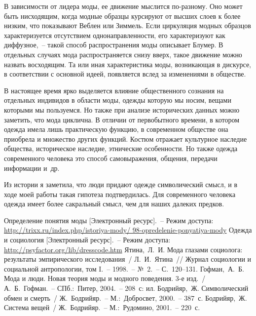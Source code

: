   В зависимости от лидера моды, ее движение мыслится по-разному. Оно может быть
  нисходящим, когда модные образцы курсируют от высших слоев к более низким, что
  показывают Веблен или Зиммель. Если циркуляция модных образцов характеризуется
  отсутствием однонаправленности, его характеризуют как диффузное,~-- такой
  способ распространения моды описывает Блумер. В отдельных случаях мода
  распространяется снизу вверх, такое движение можно назвать восходящим. Та или
  иная характеристика моды, возникающая в дискурсе, в соответствии с основной
  идеей, появляется вслед за изменениями в обществе.

  В настоящее время ярко выделяется влияние общественного сознания на отдельных
   индивидов в области моды, одежды которую мы носим, вещами которыми мы
  пользуемся. Но также при анализе исторических данных можно заметить, что мода
  циклична. В отличии от первобытного времени, в котором одежда имела лишь
  практическую функцию, в современном обществе она приобрела и множество других
  функций. Костюм отражает культурное наследие общества, историческое наследие,
  этнические особенности. Но также одежда современного человека это способ
  самовыражения, общения, передачи информации и~др.
  
  Из истории я заметила, что люди придают одежде символический смысл, и в ходе
  моей работы такая гипотеза подтвердилась. Для современного человека одежда
  имеет более сакральный смысл, чем для наших далеких предков.

  \newpage

  \renewcommand{\bibname}{Список использованной литературы}
  \begin{thebibliography}{9}
     Определение понятия моды [Электронный ресурс].~--
      Режим доступа:\\
      \url{http://trixx.ru/index.php/istoriya-mody/
        98-opredelenie-ponyatiya-mody}
     Одежда и социология [Электронный ресурс].~--
      Режим доступа:\\
      \url{http://psyfactor.org/lib/dresscode.htm}
     Ятина,~Л.~И. Мода глазами социолога: результаты
      эмпирического исследования~/ Л.~И.~Ятина~// Журнал социологии и
      социальной антропологии, том I.~-- 1998.~-- №~2.~-- С.~120--131.
     Гофман,~А.~Б. Мода и люди. Новая теория моды и модного
      поведения. 3-е изд.~/ А.~Б.~Гофман.~-- СПб.:~Питер, 2004.~-- 208~с: ил.
     Бодрийяр,~Ж. Символический обмен и смерть~/
      Ж.~Бодрийяр.~-- М.:~Добросвет, 2000.~-- 387~с.
     Бодрийяр,~Ж. Система вещей~/
      Ж.~Бодрийяр.~-- М.:~Рудомино, 2001.~-- 220~с.
  \end{thebibliography}


